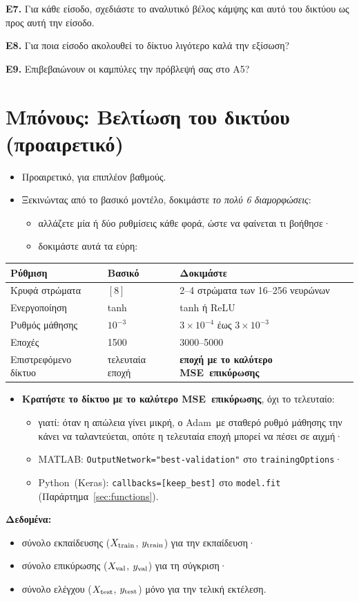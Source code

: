 \documentclass[11pt]{article}
\newcommand{\question}[2]{\par\noindent\textbf{#1.} #2\par}
\newcommand{\code}[1]{\texttt{\textlatin{#1}}}
\newcommand{\datause}[1]{\par\smallskip\needspace{4\baselineskip}\noindent\textbf{Δεδομένα:}\nopagebreak\begin{itemize}#1\end{itemize}}
\newcommand{\MSE}{\textlatin{MSE}}
\newcommand{\Adam}{\textlatin{Adam}}
\newcommand{\MATLAB}{\textlatin{MATLAB}}
\newcommand{\Python}{\textlatin{Python}}
\begin{document}
\question{Ε7}{Για κάθε είσοδο, σχεδιάστε το αναλυτικό βέλος κάμψης και αυτό του δικτύου ως προς αυτή την είσοδο.}

\question{Ε8}{Για ποια είσοδο ακολουθεί το δίκτυο λιγότερο καλά την εξίσωση?}
\question{Ε9}{Επιβεβαιώνουν οι καμπύλες την πρόβλεψή σας στο Α5?}

\section*{Μπόνους: Βελτίωση του δικτύου (προαιρετικό)}
\begin{itemize}
  \item \aitrap Προαιρετικό, για επιπλέον βαθμούς.
  \item Ξεκινώντας από το βασικό μοντέλο, δοκιμάστε \emph{το πολύ 6 διαμορφώσεις}:
  \begin{itemize}
    \item αλλάζετε μία ή δύο ρυθμίσεις κάθε φορά, ώστε να φαίνεται τι βοήθησε·
    \item δοκιμάστε αυτά τα εύρη:
  \end{itemize}
\end{itemize}
\begin{center}
\small
\begin{tabular}{@{}lll@{}}
\toprule
Ρύθμιση & Βασικό & Δοκιμάστε \\
\midrule
Κρυφά στρώματα & $[8]$ & 2--4 στρώματα των 16--256 νευρώνων \\
Ενεργοποίηση & \textlatin{tanh} & \textlatin{tanh} ή \textlatin{ReLU} \\
Ρυθμός μάθησης & $10^{-3}$ & $3\times10^{-4}$ έως $3\times10^{-3}$ \\
Εποχές & 1500 & 3000--5000 \\
Επιστρεφόμενο δίκτυο & τελευταία εποχή & \textbf{εποχή με το καλύτερο \MSE\ επικύρωσης} \\
\bottomrule
\end{tabular}
\end{center}
\begin{itemize}
  \item \textbf{Κρατήστε το δίκτυο με το καλύτερο \MSE\ επικύρωσης}, όχι το τελευταίο:
  \begin{itemize}
    \item γιατί: όταν η απώλεια γίνει μικρή, ο \Adam\ με σταθερό ρυθμό μάθησης την κάνει να ταλαντεύεται, οπότε η τελευταία εποχή μπορεί να πέσει σε αιχμή·
    \item \MATLAB: \code{OutputNetwork="best-validation"} στο \code{trainingOptions}·
    \item \Python\ (\textlatin{Keras}): \code{callbacks=[keep\_best]} στο \code{model.fit} (Παράρτημα~\ref{sec:functions}).
  \end{itemize}
\end{itemize}
\datause{
  \item σύνολο εκπαίδευσης ($X_{\rm train}$, $y_{\rm train}$) για την εκπαίδευση·
  \item σύνολο επικύρωσης ($X_{\rm val}$, $y_{\rm val}$) για τη σύγκριση·
  \item σύνολο ελέγχου ($X_{\rm test}$, $y_{\rm test}$) μόνο για την τελική εκτέλεση.}
\end{document}

